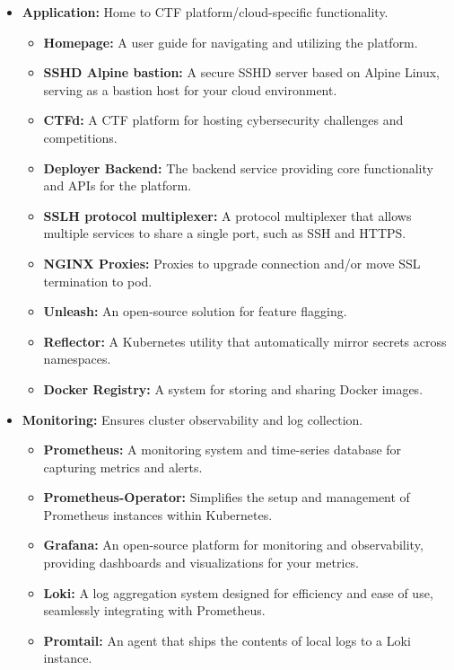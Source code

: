 \begin{itemize}
    \item \textbf{Application:} Home to CTF platform/cloud-specific functionality.
    \begin{itemize}
        \item \textbf{Homepage:} A user guide for navigating and utilizing the platform.
        \item \textbf{SSHD Alpine bastion:} A secure SSHD server based on Alpine Linux, serving as a bastion host for your cloud environment.
        \item \textbf{CTFd:} A CTF platform for hosting cybersecurity challenges and competitions.
        \item \textbf{Deployer Backend:} The backend service providing core functionality and APIs for the platform.
        \item \textbf{SSLH protocol multiplexer:} A protocol multiplexer that allows multiple services to share a single port, such as SSH and HTTPS.
        \item \textbf{NGINX Proxies:} Proxies to upgrade connection and/or move SSL termination to pod.
        \item \textbf{Unleash:} An open-source solution for feature flagging.
        \item \textbf{Reflector:} A Kubernetes utility that automatically mirror secrets across namespaces.
        \item \textbf{Docker Registry:} A system for storing and sharing Docker images.
    \end{itemize}
    \item \textbf{Monitoring:} Ensures cluster observability and log collection.
    \begin{itemize}
        \item \textbf{Prometheus:} A monitoring system and time-series database for capturing metrics and alerts.
        \item \textbf{Prometheus-Operator:} Simplifies the setup and management of Prometheus instances within Kubernetes.
        \item \textbf{Grafana:} An open-source platform for monitoring and observability, providing dashboards and visualizations for your metrics.
        \item \textbf{Loki:} A log aggregation system designed for efficiency and ease of use, seamlessly integrating with Prometheus.
        \item \textbf{Promtail:} An agent that ships the contents of local logs to a Loki instance.

\end{itemize}
\end{itemize}
